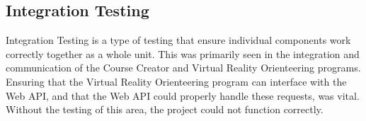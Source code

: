 \subsection{Integration Testing}
Integration Testing is a type of testing that ensure individual components work correctly together as a whole unit. This was primarily seen in the integration and communication of the Course Creator and Virtual Reality Orienteering programs. Ensuring that the Virtual Reality Orienteering program can interface with the Web API, and that the Web API could properly handle these requests, was vital. Without the testing of this area, the project could not function correctly. 